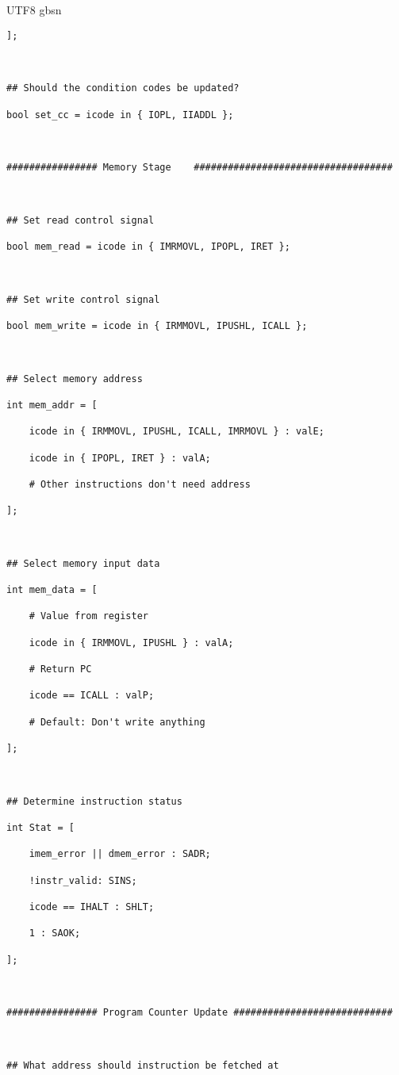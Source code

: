 \documentclass {article}
\begin{document}
\begin {CJK*} {UTF8} {gbsn}
\begin{lstlisting}
];



## Should the condition codes be updated?

bool set_cc = icode in { IOPL, IIADDL };



################ Memory Stage    ###################################



## Set read control signal

bool mem_read = icode in { IMRMOVL, IPOPL, IRET };



## Set write control signal

bool mem_write = icode in { IRMMOVL, IPUSHL, ICALL };



## Select memory address

int mem_addr = [

	icode in { IRMMOVL, IPUSHL, ICALL, IMRMOVL } : valE;

	icode in { IPOPL, IRET } : valA;

	# Other instructions don't need address

];



## Select memory input data

int mem_data = [

	# Value from register

	icode in { IRMMOVL, IPUSHL } : valA;

	# Return PC

	icode == ICALL : valP;

	# Default: Don't write anything

];



## Determine instruction status

int Stat = [

	imem_error || dmem_error : SADR;

	!instr_valid: SINS;

	icode == IHALT : SHLT;

	1 : SAOK;

];



################ Program Counter Update ############################



## What address should instruction be fetched at




\end{lstlisting}
\end{CJK*}
\end{document}
